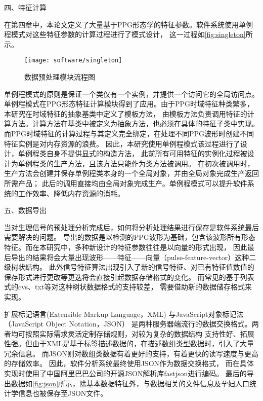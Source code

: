 四、特征计算

在第四章中，本论文定义了大量基于PPG形态学的特征参数。软件系统使用单例程模式对这些特征参数的计算过程进行了模式设计，
这一过程如\autoref{fig:singleton}所示。

\begin{figure}[htbp]
    \centering
    \texttt{[image: software/singleton]}
    \caption{\label{fig:singleton}数据预处理模块流程图}
\end{figure}

单例程模式的原则是保证一个类仅有一个实例，并提供一个访问它的全局访问点。
单例程模式在PPG形态特征计算模块得到了应用。由于PPG时域特征种类繁多，本研究在时域特征的抽象基类中定义了模板方法，
由模板方法负责调用特征的计算方法。计算方法在基类中被定义为抽象方法，也必须在具体的特征子类中实现。
而PPG时域特征的计算过程与其定义完全绑定，在处理不同PPG波形时创建不同特征实例是对内存资源的浪费。
因此，本研究使用单例程模式该过程进行了设计，单例程类自身不提供显式的构造方法，
此前所有可用特征的实例化过程被设计为单例程类的生产方法，且该方法只能作为类方法被调用。
在初次被调用时，生产方法会创建并保存单例程类本身的一个全局对象，并由全局对象完成生产返回所需产品；
此后的调用直接均由全局对象完成生产。单例程模式可以提升软件系统的工作效率、降低内存资源的消耗。

五、数据导出

当对生理信号的预处理分析完成后，如何将分析处理结果进行保存是软件系统最后需要解决的问题。
导出的数据是以检测的PPG波形为基础，包含该波形所有形态特征。而在本研究中，多种新设计的特征参数往往是以向量的形式出现，
因此最后导出的结果将会大量出现波形——特征——向量（pulse-feature-vector）这种二级树状结构。
此外信号特征算法出现引入了新的信号特征、对已有特征值数值的保存形式进行更改等更迭将会直接引起数据存储格式的变化。
而常见的基于列表式的cvs、txt等对这种树状数据格式的支持较差，
需要借助新的数据储存格式来实现。

扩展标记语言(Extensible Markup Language，XML) \cite{xml,Li2016}与JavaScript对象标记法（JavaScript Object Notation，JSON）\cite{json,Crockford2006}
是两种服务器端流行的数据交换格式。两者均可按照实际需求灵活定制存储规则，对较为复杂的数据结构
支持性好、拓展性强。但由于XML是基于标签描述数据的，在描述数组类型数据时，引入了大量冗余信息。
而JSON则对数组类数据有着更好的支持，有着更快的读写速度与更高的存储效率\cite{Nurseitov2009}。
因此，软件分析系统最终使用JSON作为数据交换格式，
而在具体实现时使用了中国阿里巴巴公司的开源JSON解析库fastjson\cite{fastjson}进行编码。
最后的导出数据如\autoref{fig:json}所示，除基本数据特征外，与数据相关的文件信息及孕妇人口统计学信息也被保存至JSON文件。

